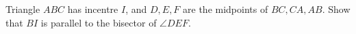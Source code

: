 Triangle $ABC$ has incentre $I$, and $D,E,F$ are the midpoints of $BC,CA,AB$. Show that $BI$ is parallel to the bisector of $\angle DEF$.
